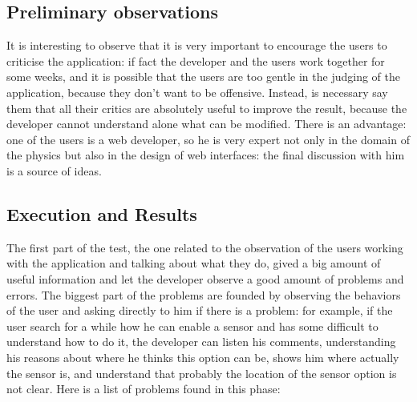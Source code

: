\subsection{Preliminary observations}
It is interesting to observe that it is very important to encourage the users to criticise the application: if fact the developer and the users work together for some weeks, and it is possible that the users are too gentle in the judging of the application, because they don't want to be offensive. Instead, is necessary say them that all their critics are absolutely useful to improve the result, because the developer cannot understand alone what can be modified. 
There is an advantage: one of the users is a web developer, so he is very expert not only in the domain of the physics but also in the design of web interfaces: the final discussion with him is a source of ideas.  

\subsection{Execution and Results}
The first part of the test, the one related to the observation of the users working with the application and talking about what they do, gived a big amount of useful information and let the developer observe a good amount of problems and errors. 
The biggest part of the problems are founded by observing the behaviors of the user and asking directly to him if there is a problem: for example, if the user search for a while how he can enable a sensor and has some difficult to understand how to do it, the developer can listen his comments, understanding his reasons about where he thinks this option can be, shows him where actually the sensor is, and understand that probably the location of the sensor option is not clear. 
Here is a list of problems found in this phase:

